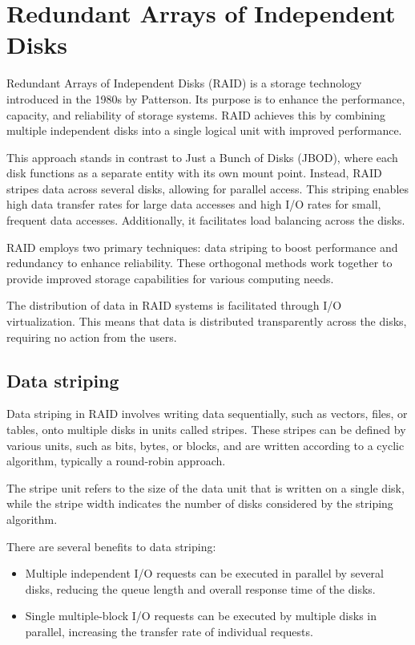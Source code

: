 \section{Redundant Arrays of Independent Disks}

Redundant Arrays of Independent Disks (RAID) is a storage technology introduced in the 1980s by Patterson. 
Its purpose is to enhance the performance, capacity, and reliability of storage systems. 
RAID achieves this by combining multiple independent disks into a single logical unit with improved performance.

This approach stands in contrast to Just a Bunch of Disks (JBOD), where each disk functions as a separate entity with its own mount point.
Instead, RAID stripes data across several disks, allowing for parallel access. 
This striping enables high data transfer rates for large data accesses and high I/O rates for small, frequent data accesses.
Additionally, it facilitates load balancing across the disks.

RAID employs two primary techniques: data striping to boost performance and redundancy to enhance reliability. 
These orthogonal methods work together to provide improved storage capabilities for various computing needs.

The distribution of data in RAID systems is facilitated through I/O virtualization.
This means that data is distributed transparently across the disks, requiring no action from the users. 

\subsection{Data striping}
Data striping in RAID involves writing data sequentially, such as vectors, files, or tables, onto multiple disks in units called stripes. 
These stripes can be defined by various units, such as bits, bytes, or blocks, and are written according to a cyclic algorithm, typically a round-robin approach.

The stripe unit refers to the size of the data unit that is written on a single disk, while the stripe width indicates the number of disks considered by the striping algorithm.

There are several benefits to data striping:
\begin{itemize}
    \item Multiple independent I/O requests can be executed in parallel by several disks, reducing the queue length and overall response time of the disks.
    \item Single multiple-block I/O requests can be executed by multiple disks in parallel, increasing the transfer rate of individual requests.
\end{itemize}

